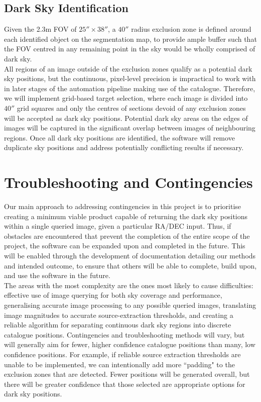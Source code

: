 \documentclass[11pt]{article}
\begin{document}
\subsection{Dark Sky Identification}
Given the 2.3m FOV of $25''\times38''$, a $40''$ radius exclusion zone is defined around each identified object on the segmentation map, to provide ample buffer such that the FOV centred in any remaining point in the sky would be wholly comprised of dark sky. \\

All regions of an image outside of the exclusion zones qualify as a potential dark sky positions, but the continuous, pixel-level precision is impractical to work with in later stages of the automation pipeline making use of the catalogue. Therefore, we will implement grid-based target selection, where each image is divided into $40''$ grid squares and only the centres of sections devoid of any exclusion zones will be accepted as dark sky positions. Potential dark sky areas on the edges of images will be captured in the significant overlap between images of neighbouring regions. Once all dark sky positions are identified, the software will remove duplicate sky positions and address potentially conflicting results if necessary. 

\section{Troubleshooting and Contingencies}
Our main approach to addressing contingencies in this project is to prioritise creating a minimum viable product capable of returning the dark sky positions within a single queried image, given a particular RA/DEC input. Thus, if obstacles are encountered that prevent the completion of the entire scope of the project, the software can be expanded upon and completed in the future. This will be enabled through the development of documentation detailing our methods and intended outcome, to ensure that others will be able to complete, build upon, and use the software in the future. \\

The areas with the most complexity are the ones most likely to cause difficulties: effective use of image querying for both sky coverage and performance, generalising accurate image processing to any possible queried images, translating image magnitudes to accurate source-extraction thresholds, and creating a reliable algorithm for separating continuous dark sky regions into discrete catalogue positions. Contingencies and troubleshooting methods will vary, but will generally aim for fewer, higher confidence catalogue positions than many, low confidence positions. For example, if reliable source extraction thresholds are unable to be implemented, we can intentionally add more ``padding" to the exclusion zones that are detected. Fewer positions will be generated overall, but there will be greater confidence that those selected are appropriate options for dark sky positions. 
\end{document}
